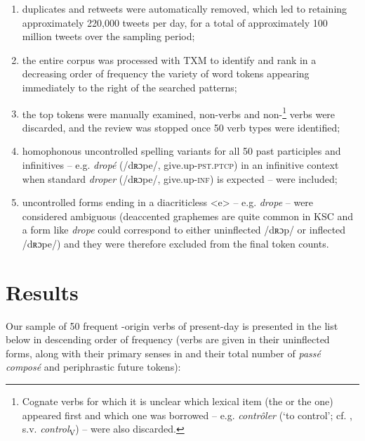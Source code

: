 \documentclass[output=paper,colorlinks,citecolor=brown]{langscibook}
\begin{document}
\begin{enumerate}[label=(\roman*)]
	\item duplicates and retweets were automatically removed, which led to
	retaining approximately 220,000 tweets per day, for a total of
	approximately 100 million tweets over the sampling period;
	
	\item the entire corpus was processed with TXM \citep{heiden2010} to identify
	and rank in a decreasing order of frequency the variety of word tokens
	appearing immediately to the right of the searched patterns;
	
	\item the top tokens were manually examined, non-verbs and non-\footnote{Cognate verbs for which it is unclear which lexical item (the  or the  one) appeared first and which one was borrowed -- e.g. \emph{contrôler} (`to control'; cf. , s.v. \emph{control}\textsubscript{V}) -- were also discarded.} verbs were discarded, and the review was stopped once 50 verb types were identified;
	
	\item homophonous uncontrolled spelling variants for all 50 past participles and infinitives -- e.g. \emph{dropé} (/dʀɔpe/, give.up-\textsc{pst.ptcp}) in an infinitive context when standard \emph{droper} (/dʀɔpe/, give.up-\textsc{inf}) is expected -- were included;
	
	\item uncontrolled forms ending in a diacriticless \textless e\textgreater{} -- e.g. \emph{drope} -- were considered ambiguous (deaccented graphemes are quite common in  KSC \citep{cougnon2010} and a form like \emph{drope} could correspond to either uninflected /dʀɔp/ or inflected /dʀɔpe/) and they were therefore excluded from the final token counts.
\end{enumerate}


\section{Results} \label{09sec3}

Our sample of 50 frequent -origin verbs of present-day  is presented in the list below in descending order of frequency (verbs are given in their uninflected forms, along with their primary senses in  and their total number of \emph{passé composé} and periphrastic future tokens):
\end{document}
